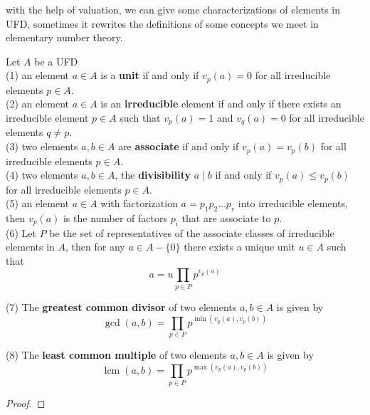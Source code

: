with the help of valuation, we can give some characterizations of elements in UFD, sometimes it rewrites the definitions of some concepts we meet in elementary number theory.
\begin{proposition}
    Let \(A\) be a UFD\\

    (1) an element \(a \in A\) is a \textbf{unit} if and only if \(v_p(a) = 0\) for all irreducible elements \(p \in A\).\\

    (2) an element \(a \in A\) is an \textbf{irreducible} element if and only if there exists an irreducible element \(p \in A\) such that \(v_p(a) = 1\) and \(v_q(a) = 0\) for all irreducible elements \(q \neq p\).\\

    (3) two elements \(a,b \in A\) are \textbf{associate} if and only if \(v_p(a) = v_p(b)\) for all irreducible elements \(p \in A\).\\

    (4) two elements \(a,b \in A\), the \textbf{divisibility} \(a \mid b\) if and only if \(v_p(a) \leq v_p(b)\) for all irreducible elements \(p \in A\).\\

    (5) an element \(a \in A\) with factorization \(a = p_1p_2\dots p_r\) into irreducible elements, then \(v_p(a)\) is the number of factors \(p_i\) that are associate to \(p\).\\

    (6) Let \(P\) be the set of representatives of the associate classes of irreducible elements in \(A\), then for any \(a \in A-\{0\}\) there exists a unique unit \(u \in A\) such that
    \[a = u \prod_{p \in P} p^{v_p(a)}\]

    (7) The \textbf{greatest common divisor} of two elements \(a,b \in A\) is given by
    \[\gcd(a,b) = \prod_{p \in P} p^{\min(v_p(a),v_p(b))}\]

    (8) The \textbf{least common multiple} of two elements \(a,b \in A\) is given by
    \[\operatorname{lcm}(a,b) = \prod_{p \in P} p^{\max(v_p(a),v_p(b))}\]
\end{proposition}
\begin{proof}
    
\end{proof}

